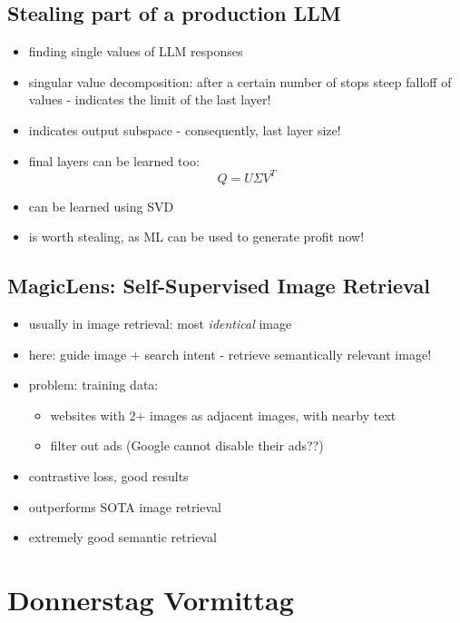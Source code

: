 \documentclass[a4paper]{article}
\begin{document}
\subsection*{Stealing part of a production LLM}
\begin{itemize}
    \item finding single values of LLM responses
    \item singular value decomposition: after a certain number of stops steep falloff of values - indicates the limit of the last layer!
    \item indicates output subspace - consequently, last layer size!
    \item final layers can be learned too:
          \begin{equation}
              Q=U\Sigma V^T
          \end{equation}
    \item can be learned using SVD
    \item is worth stealing, as ML can be used to generate profit now!
\end{itemize}
\subsection*{MagicLens: Self-Supervised Image Retrieval}
\begin{itemize}
    \item usually in image retrieval: most \emph{identical} image
    \item here: guide image + search intent - retrieve semantically relevant image!
    \item problem: training data:
          \begin{itemize}
              \item websites with 2+ images as adjacent images, with nearby text
              \item filter out ads (Google cannot disable their ads??)
          \end{itemize}
    \item contrastive loss, good results
    \item outperforms SOTA image retrieval
    \item extremely good semantic retrieval
\end{itemize}
\section*{Donnerstag Vormittag}
\end{document}
